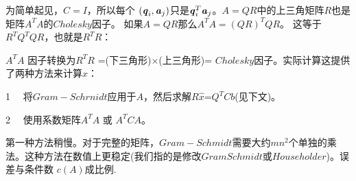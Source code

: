 为简单起见，$C = I$，所以每个 $(\textbf{\textit{q}}_{i}, \textbf{\textit{a}}_{j})$只是$\textbf{\textit{q}}^{T}_{i}\textbf{\textit{a}}_{j} $。$A = QR$中的上三角矩阵$R$也是矩阵$A^{T}A$的$Cholesky$因子。 如果$A = QR$那么$A^{T}A=(QR)^{T}QR $。 这等于$R^{T} Q^{T} QR$，也就是$R^{T}R$：

$A^{T}A$ 因子转换为$R^{T}R$ =(下三角形)×(上三角形)= $Cholesky$因子。实际计算这提供了两种方法来计算$\hat{x}$：
\begin{flushleft}
	1 \ \  将$Gram-Schrnidt$应用于$A$，然后求解$R\hat{x}$=$Q^{T} C b $(见下文)。
\end{flushleft} 
\begin{flushleft}
	2 \ \   使用系数矩阵$A^{T}A$ 或 $A^{T}CA$。
\end{flushleft}
第一种方法稍慢。对于完整的矩阵，$Gram-Schmidt$需要大约$mn^{2}$个单独的乘法。这种方法在数值上更稳定(我们指的是修改$GramSchmidt$或$Householder$)。误差与条件数 $c(A)$成比例.

